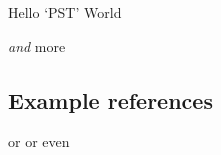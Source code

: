 \documentclass{memoir}
\begin{document}
\pex\label{multiparttest} \a\label{test2} Hello  `PST'
\a\label{test3} World

\emph{and} more \xe

\subsection{Example references}


 or  or even 




\printbibliography
\end{document}
